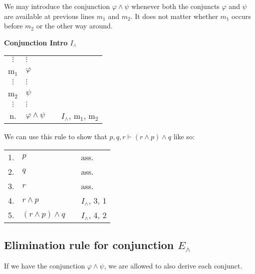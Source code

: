 \documentclass[nobib,nofonts]{tufte-handout}
\begin{document}
We may introduce the conjunction $\varphi \wedge \psi$ whenever both the conjuncts $\varphi$ and $\psi$ are available at previous lines $m_{1}$ and $m_{2}$. It does not matter whether $m_{1}$ occurs before $m_{2}$ or the other way around.

\bigskip
\noindent \colorbox{mygray!60}{\centering
  \begin{minipage}[t]{0.35\linewidth}
    \textbf{Conjunction Intro $I_{\wedge}$}
  \end{minipage}
  \begin{minipage}[t]{0.55\linewidth}
    \begin{tabular}{clcl}
      $\vdots$ & $\vdots$              & \\
      m$_{1}$  & $\varphi$             &  \\
      $\vdots$ & $\vdots$              & \\
      m$_{2}$  & $\psi$                & \\
      $\vdots$ & $\vdots$              & \\
      n.       & $\varphi \wedge \psi$ & & $I_{\wedge}$, m$_{1}$, m$_{2}$
    \end{tabular}
  \end{minipage}
}
\bigskip

We can use this rule to show that $p, q, r \vdash (r \wedge p) \wedge q$ like so:

\begin{tabular}{clcl}
  1. & $p$ & & ass. \\
  2. & $q$ & & ass. \\
  3. & $r$ & & ass. \\
  4. & $r \wedge p$ & & $I_{\wedge}$, 3, 1  \\
  5. & $(r \wedge p) \wedge q$ & & $I_{\wedge}$, 4, 2  \\
\end{tabular}


\subsection{Elimination rule for conjunction $E_{\wedge}$}

If we have the conjunction $\varphi \wedge \psi$, we are allowed to also derive each conjunct.
\end{document}
